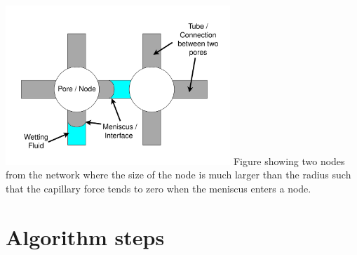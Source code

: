 \documentclass[12pt, a4paper]{article}
\begin{document}
\includegraphics[height=6cm]{fig_descp-of-model}
Figure showing two nodes from the network where the size of the node is much larger than the radius such that the capillary force tends to zero when the meniscus enters a node. 

\section{Algorithm steps}
\end{document}
